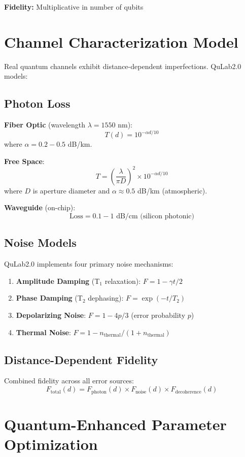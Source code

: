 \documentclass[11pt,a4paper]{article}
\begin{document}
\textbf{Fidelity:} Multiplicative in number of qubits

\section{Channel Characterization Model}

Real quantum channels exhibit distance-dependent imperfections. QuLab2.0 models:

\subsection{Photon Loss}

\textbf{Fiber Optic} (wavelength $\lambda = 1550$ nm):
$$T(d) = 10^{-\alpha d / 10}$$
where $\alpha = 0.2-0.5$ dB/km.

\textbf{Free Space}:
$$T = \left(\frac{\lambda}{\pi D}\right)^2 \times 10^{-\alpha d / 10}$$
where $D$ is aperture diameter and $\alpha \approx 0.5$ dB/km (atmospheric).

\textbf{Waveguide} (on-chip):
$$\text{Loss} = 0.1-1 \text{ dB/cm (silicon photonic)}$$

\subsection{Noise Models}

QuLab2.0 implements four primary noise mechanisms:

\begin{enumerate}
    \item \textbf{Amplitude Damping} (T$_1$ relaxation): $F = 1 - \gamma t / 2$
    \item \textbf{Phase Damping} (T$_2$ dephasing): $F = \exp(-t/T_2)$
    \item \textbf{Depolarizing Noise}: $F = 1 - 4p/3$ (error probability $p$)
    \item \textbf{Thermal Noise}: $F = 1 - n_{\text{thermal}} / (1 + n_{\text{thermal}})$
\end{enumerate}

\subsection{Distance-Dependent Fidelity}

Combined fidelity across all error sources:
$$F_{\text{total}}(d) = F_{\text{photon}}(d) \times F_{\text{noise}}(d) \times F_{\text{decoherence}}(d)$$

\section{Quantum-Enhanced Parameter Optimization}
\end{document}
